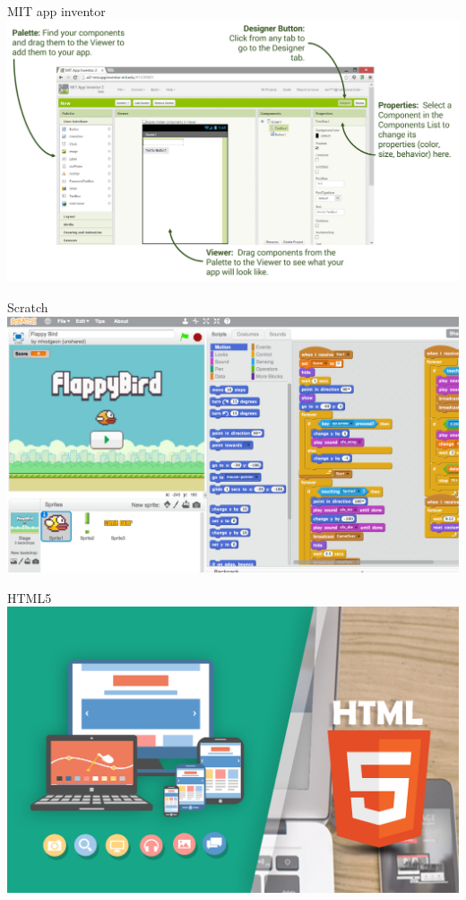 \documentclass[10pt]{beamer}
\begin{document}
\begin{frame}{MIT app inventor}
	\centering
	\includegraphics[width=\linewidth]{img/mitappinventor.png}
\end{frame}

\begin{frame}{Scratch}
	\centering
	\includegraphics[width=\linewidth]{img/flappy-bird-in-scratch.png}

\end{frame}

\begin{frame}{HTML5}
	\centering
	\includegraphics[width=\linewidth]{img/html5.png}

\end{frame}
\end{document}
